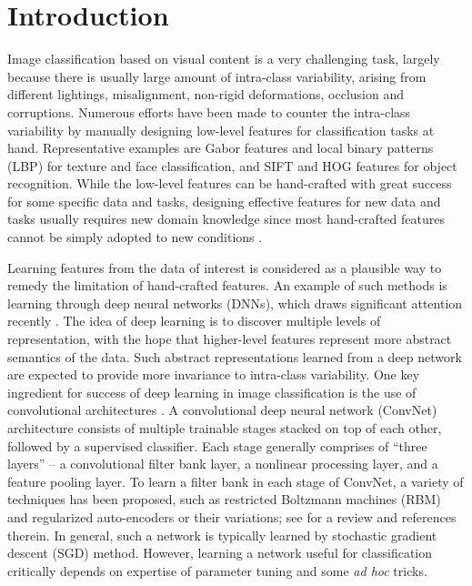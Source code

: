 \documentclass[10pt,journal,compsoc]{IEEEtran}
\begin{document}
\maketitle





\IEEEdisplaynontitleabstractindextext










\section{Introduction}
Image classification based on visual content is a very challenging task, largely because there is usually large amount of intra-class variability, arising from different lightings, misalignment, non-rigid deformations, occlusion and corruptions. Numerous efforts have been made to counter the intra-class variability by manually designing low-level features for classification tasks at hand. Representative examples are Gabor features and local binary patterns (LBP) for texture and face classification, and SIFT and HOG features for object recognition. While the low-level features can be hand-crafted with great success for some specific data and tasks, designing effective features for new data and tasks usually requires new domain knowledge since most hand-crafted features cannot be simply adopted to new conditions \cite{Hinton2006, Bengio2013}.


Learning features from the data of interest is considered as a plausible way to remedy the limitation of hand-crafted features. An example of such methods is learning through deep neural networks (DNNs), which draws significant attention recently \cite{Hinton2006}. The idea of deep learning is to discover multiple levels of representation, with the hope that higher-level features represent more abstract semantics of the data. Such abstract representations learned from a deep network are expected to provide more invariance to intra-class variability. One key ingredient for success of deep learning in image classification is the use of convolutional architectures \cite{Goodfellow2013, LeCun1998, Jarrett2009, Bruna2013, Lee2009, Krizhevsky2012, Kayukcuoglu2010, Sifre2013}. A convolutional deep neural network (ConvNet) architecture \cite{LeCun1998, Jarrett2009, Kayukcuoglu2010, Goodfellow2013, Krizhevsky2012} consists of multiple trainable stages stacked on top of each other, followed by a supervised classifier. Each stage generally comprises of ``three layers'' -- a convolutional filter bank layer, a nonlinear processing layer, and a feature pooling layer. To learn a filter bank in each stage of ConvNet, a variety of techniques has been proposed, such as restricted Boltzmann machines (RBM) \cite{Lee2009} and regularized auto-encoders or their variations; see \cite{Bengio2013} for a review and references therein. In general, such a network is typically learned by stochastic gradient descent (SGD) method. However, learning a network useful for classification critically depends on expertise of parameter tuning and some {\em ad hoc} tricks.
\end{document}
